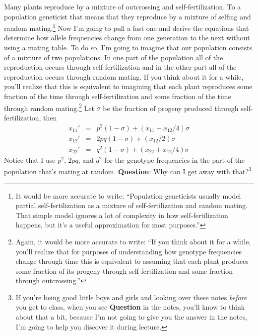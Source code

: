 \documentclass[12pt]{article}
\begin{document}
Many plants reproduce by a mixture of outcrossing and
self-fertilization. To a
population geneticist that means that they reproduce by a mixture of
selfing and random mating.\footnote{It would be more accurate to
  write: ``Population geneticists usually model partial
  self-fertilization as a mixture of self-fertilization and random
  mating. That simple model ignores a lot of complexity in how
  self-fertilization happens, but it's a useful approximation for most
  purposes.''} Now I'm going to pull a fast one and derive the
equations that determine how allele frequencies change from one
generation to the next without using a mating table. To do so, I'm
going to imagine that our population consists of a mixture of two
populations. In one part of the population all of the reproduction
occurs through self-fertilization and in the other part all of the
reproduction occurs through random mating. If you think about it for a
while, you'll realize that this is equivalent to imagining that each
plant reproduces some fraction of the time through self-fertilization
and some fraction of the time through random mating.\footnote{Again,
  it would be more accurate to write: ``If you think about it for a
  while, you'll realize that for purposes of understanding how
  genotype frequencies change through time this is equivalent to
  assuming that each plant produces some fraction of its progeny
  through self-fertilization and some fraction through outcrossing.''}
Let $\sigma$ be the fraction of progeny produced through
self-fertilization, then
\begin{eqnarray}
x_{11}' &=& p^2(1-\sigma) + (x_{11} + x_{12}/4)\sigma \\
x_{12}' &=& 2pq(1-\sigma) + (x_{12}/2)\sigma  \label{eq:het} \\
x_{22}' &=& q^2(1-\sigma) + (x_{22} + x_{12}/4)\sigma
\end{eqnarray}
Notice that I use $p^2$, $2pq$, and $q^2$ for the genotype frequencies
in the part of the population that's mating at random. {\bf Question}:
Why can I get away with that?\footnote{If you're being good little
  boys and girls and looking over these notes {\it before\/} you get
  to class, when you see {\bf Question} in the notes, you'll know to
  think about that a bit, because I'm not going to give you the answer
  in the notes, I'm going to help you discover it during lecture.}
\end{document}
